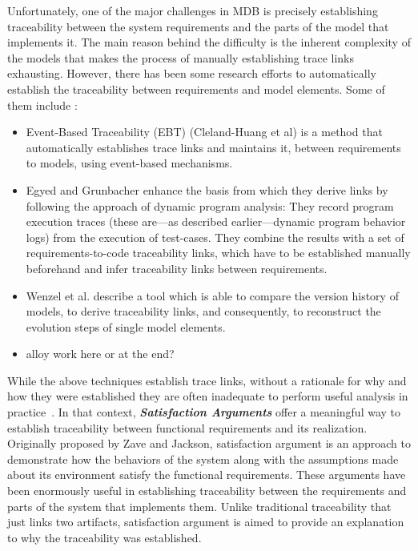 Unfortunately, one of the major challenges in MDB is precisely establishing traceability between the system requirements and the parts of the model that implements it. The main reason behind the difficulty is the inherent complexity of the models that makes the process of manually establishing trace links exhausting. However, there has been some research efforts to automatically establish the traceability between requirements and model elements. Some of them include :
\begin{itemize}
  \item Event-Based Traceability (EBT) (Cleland-Huang et al) is a method that automatically establishes trace links and maintains it, between requirements to models, using event-based mechanisms.
  \item Egyed and Grunbacher enhance the basis from which they derive links by following the approach of dynamic program analysis: They record program execution traces (these are—as described earlier—dynamic program behavior logs) from the execution of test-cases. They combine the results with a set of requirements-to-code traceability links, which have to be established manually beforehand and infer traceability links between requirements.
  \item Wenzel et al. describe a tool which is able to compare the version history of models, to derive traceability links, and consequently, to reconstruct the evolution steps of single model elements.
  \item alloy work here or at the end?
\end{itemize}

While the above techniques establish trace links, without a rationale for why and how they were established they are often inadequate to perform useful analysis in practice~\cite{Trace links explained: An automated approach for generating rationales}. In that context, \textbf{\emph{Satisfaction Arguments}} offer a meaningful way to establish traceability between functional requirements and its realization. Originally proposed by Zave and Jackson, satisfaction argument is an approach to demonstrate how the behaviors of the system along with the assumptions made about its environment satisfy the functional requirements. These arguments have been enormously useful in establishing traceability between the requirements and parts of the system that implements them. Unlike traditional traceability that just links two artifacts, satisfaction argument is aimed to provide an explanation to why the traceability was established.

